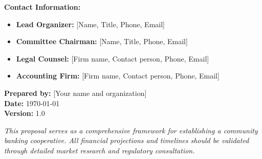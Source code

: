 \documentclass[11pt,letterpaper]{article}
\begin{document}
\vspace{2cm}

\noindent\textbf{Contact Information:}
\begin{itemize}[leftmargin=*]
    \item \textbf{Lead Organizer:} [Name, Title, Phone, Email]
    \item \textbf{Committee Chairman:} [Name, Title, Phone, Email]
    \item \textbf{Legal Counsel:} [Firm name, Contact person, Phone, Email]
    \item \textbf{Accounting Firm:} [Firm name, Contact person, Phone, Email]
\end{itemize}

\vspace{1cm}

\noindent\textbf{Prepared by:} [Your name and organization] \\
\noindent\textbf{Date:} \today \\
\noindent\textbf{Version:} 1.0

\vspace{1cm}

\noindent\textit{This proposal serves as a comprehensive framework for establishing a community banking cooperative. All financial projections and timelines should be validated through detailed market research and regulatory consultation.}
\end{document}
